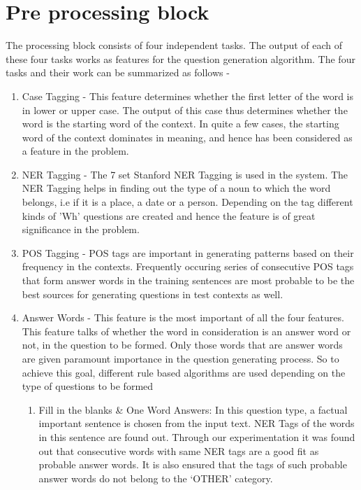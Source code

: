 \section{Pre processing block}

The processing block consists of four independent tasks.
The output of each of these four tasks works as features for the question
generation algorithm. The four tasks and their work can be summarized as follows -

\begin{enumerate}

\item Case Tagging - This feature determines whether the first
letter of the word is in lower or upper case. The output of this case thus
determines whether the word is the starting word of the context. In quite a few
cases, the starting word of the context dominates in meaning, and hence has been
considered as a feature in the problem.

\item NER Tagging - The 7 set Stanford NER Tagging is used in the system. The
NER Tagging helps in finding out the type of a noun to which the word belongs, i.e if it is a place, a
date or a person. Depending on the tag different kinds of 'Wh' questions are created and hence
the feature is of great significance in the problem.

\item POS Tagging - POS tags are important in generating patterns based on their
frequency in the contexts. Frequently occuring series of consecutive POS tags
that form answer words in the training sentences are most probable to be the
best sources for generating questions in test contexts as well.

\item Answer Words -
	This feature is the most important of all the four features. This
	feature talks of whether the word in consideration is an answer
	word or not, in the question to be formed. Only those words that
	are answer words are given paramount importance in the question
	generating process. 
	So to achieve this goal, different rule based algorithms are
	used depending on the type of questions to be formed

	\begin{enumerate}

	\item Fill in the blanks \& One Word Answers: In this question type, a
	factual important sentence is chosen from the input text. NER
	Tags of the words in this sentence are found out. Through our
	experimentation it was found out that consecutive words with
	same NER tags are a good fit as probable answer words. It is
	also ensured that the tags of such probable answer words do not
	belong to the ‘OTHER’ category.


\end{enumerate}
\end{enumerate}
